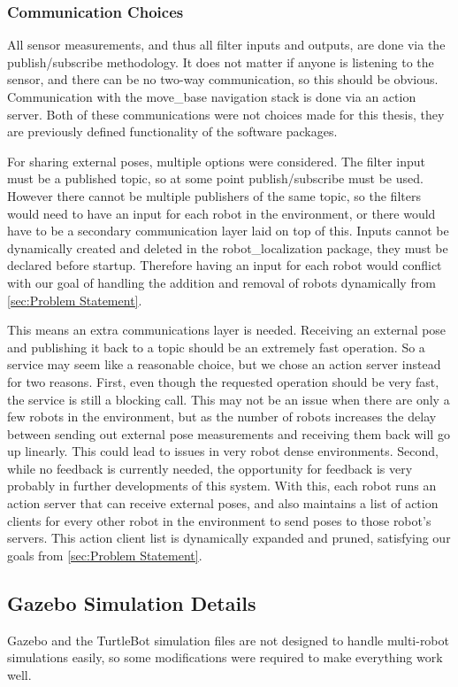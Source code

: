 \documentclass[thesis.tex]{subfile}
\begin{document}
\subsubsection{Communication Choices}
All sensor measurements, and thus all filter inputs and outputs, are done via the publish/subscribe methodology. It does not matter if anyone is listening to the sensor, and there can be no two-way communication, so this should be obvious. Communication with the move\_base navigation stack is done via an action server. Both of these communications were not choices made for this thesis, they are previously defined functionality of the software packages.

For sharing external poses, multiple options were considered. The filter input must be a published topic, so at some point publish/subscribe must be used. However there cannot be multiple publishers of the same topic, so the filters would need to have an input for each robot in the environment, or there would have to be a secondary communication layer laid on top of this. Inputs cannot be dynamically created and deleted in the robot\_localization package, they must be declared before startup. Therefore having an input for each robot would conflict with our goal of handling the addition and removal of robots dynamically from \autoref{sec:Problem Statement}.

This means an extra communications layer is needed. Receiving an external pose and publishing it back to a topic should be an extremely fast operation. So a service may seem like a reasonable choice, but we chose an action server instead for two reasons. First, even though the requested operation should be very fast, the service is still a blocking call. This may not be an issue when there are only a few robots in the environment, but as the number of robots increases the delay between sending out external pose measurements and receiving them back will go up linearly. This could lead to issues in very robot dense environments. Second, while no feedback is currently needed, the opportunity for feedback is very probably in further developments of this system. With this, each robot runs an action server that can receive external poses, and also maintains a list of action clients for every other robot in the environment to send poses to those robot's servers. This action client list is dynamically expanded and pruned, satisfying our goals from \autoref{sec:Problem Statement}.

\subsection{Gazebo Simulation Details} \label{sec:sim_details}
Gazebo and the TurtleBot simulation files are not designed to handle multi-robot simulations easily, so some modifications were required to make everything work well.
\end{document}
